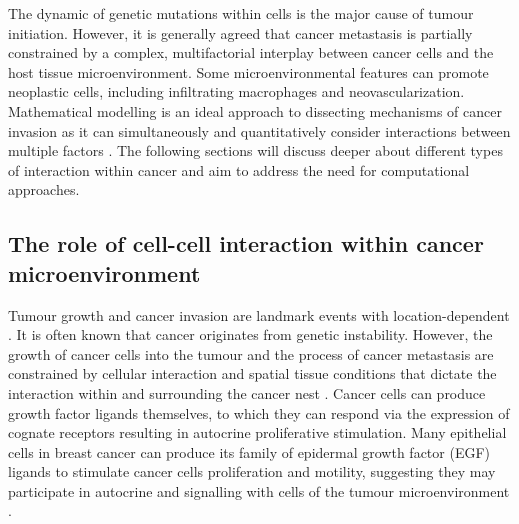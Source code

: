 The dynamic of genetic mutations within cells is the major cause of tumour initiation. However, it is generally agreed that cancer metastasis is partially constrained by a complex, multifactorial interplay between cancer cells and the host tissue microenvironment. Some microenvironmental features can promote neoplastic cells, including infiltrating macrophages and neovascularization. Mathematical modelling is an ideal approach to dissecting mechanisms of cancer invasion as it can simultaneously and quantitatively consider interactions between multiple factors \cite{anderson2006tumor}. The following sections will discuss deeper about different types of interaction within cancer and aim to address the need for computational approaches.       

\subsection{The role of cell-cell interaction within cancer microenvironment}
Tumour growth and cancer invasion are landmark events with location-dependent \cite{friedl2011cancer}. It is often known that cancer originates from genetic instability. However, the growth of cancer cells into the tumour and the process of cancer metastasis are constrained by cellular interaction and spatial tissue conditions that dictate the interaction within and surrounding the cancer nest \cite{west2019cellular, liotta2001microenvironment,anderson2006tumor}. Cancer cells can produce growth factor ligands themselves, to which they can respond via the expression of cognate receptors resulting in autocrine proliferative stimulation. Many epithelial cells in breast cancer can produce its family of epidermal growth factor (EGF) ligands to stimulate cancer cells proliferation and motility, suggesting they may participate in autocrine and signalling with cells of the tumour microenvironment \cite{nickerson2013autocrine}.  

